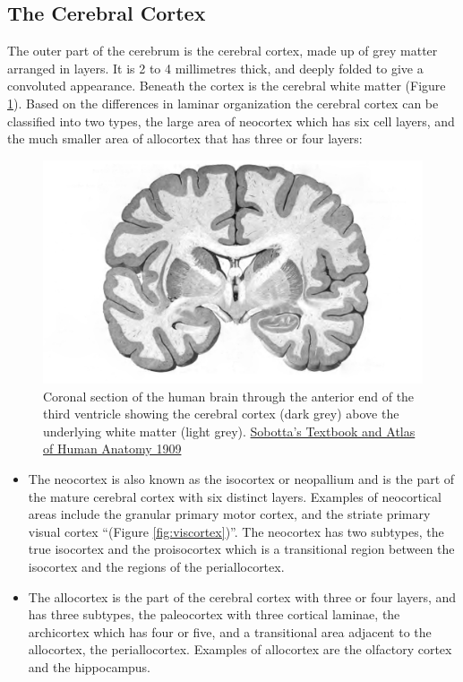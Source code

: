 \hypertarget{the-cerebral-cortex}{%
\subsection{The Cerebral Cortex}\label{the-cerebral-cortex}}

The outer part of the cerebrum is the cerebral cortex, made up of grey matter arranged in layers. It is 2 to 4 millimetres thick, and deeply folded to give a convoluted appearance. Beneath the cortex is the cerebral white matter (Figure \ref{fig:coronalsection}). Based on the differences in laminar organization the cerebral cortex can be classified into two types, the large area of neocortex which has six cell layers, and the much smaller area of allocortex that has three or four layers:



\begin{figure}

{\centering \includegraphics[width=0.7\linewidth]{./figures/cns/Sobo_1909_645_no_labels} 

}

\caption{Coronal section of the human brain through the anterior end of the third ventricle showing the cerebral cortex (dark grey) above the underlying white matter (light grey). \href{https://commons.wikimedia.org/wiki/File:Sobo_1909_645.png}{Sobotta's Textbook and Atlas of Human Anatomy 1909}}\label{fig:coronalsection}
\end{figure}

\begin{itemize}
\tightlist
\item
  The neocortex is also known as the isocortex or neopallium and is the part of the mature cerebral cortex with six distinct layers. Examples of neocortical areas include the granular primary motor cortex, and the striate primary visual cortex ``(Figure \ref{fig:viscortex})''. The neocortex has two subtypes, the true isocortex and the proisocortex which is a transitional region between the isocortex and the regions of the periallocortex.
\item
  The allocortex is the part of the cerebral cortex with three or four layers, and has three subtypes, the paleocortex with three cortical laminae, the archicortex which has four or five, and a transitional area adjacent to the allocortex, the periallocortex. Examples of allocortex are the olfactory cortex and the hippocampus.
\end{itemize}

